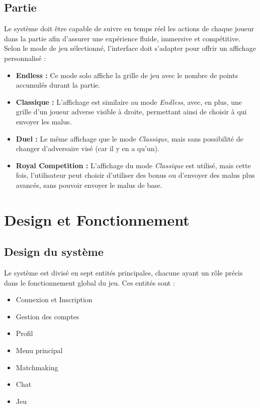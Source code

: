 \documentclass{report}
\begin{document}
\section{Partie}

\noindent Le système doit être capable de suivre en temps réel les actions de chaque joueur dans la partie afin d'assurer une expérience fluide, immersive et compétitive. Selon le mode de jeu sélectionné, l'interface doit s'adapter pour offrir un affichage personnalisé :

\begin{itemize}
    \item \textbf{Endless :} Ce mode solo affiche la grille de jeu avec le nombre de points accumulés durant la partie.
    \item \textbf{Classique :} L'affichage est similaire au mode \emph{Endless}, avec, en plus, une grille d'un joueur adverse visible à droite, permettant ainsi de choisir à qui envoyer les malus.
    \item \textbf{Duel :} Le même affichage que le mode \emph{Classique}, mais sans possibilité de changer d'adversaire visé (car il y en a qu'un).
    \item \textbf{Royal Competition :} L'affichage du mode \emph{Classique} est utilisé, mais cette fois, l'utilisateur peut choisir d'utiliser des bonus ou d'envoyer des malus plus avancés, sans pouvoir envoyer le malus de base.
\end{itemize}




\chapter{Design et Fonctionnement}
\label{chap:design}

\section*{Design du système}

\noindent Le système est divisé en sept entités principales, chacune ayant un rôle précis dans le fonctionnement global du jeu. Ces entités sont :  
\begin{itemize}
    \item Connexion et Inscription
    \item Gestion des comptes
    \item Profil
    \item Menu principal
    \item Matchmaking
    \item Chat
    \item Jeu
\end{itemize}
\end{document}
